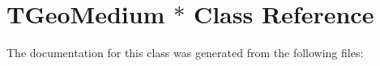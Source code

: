 \hypertarget{class_t_geo_medium_01_5}{}\section{T\+Geo\+Medium $\ast$ Class Reference}
\label{class_t_geo_medium_01_5}


The documentation for this class was generated from the following files\+: